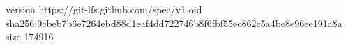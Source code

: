 version https://git-lfs.github.com/spec/v1
oid sha256:9cbeb7b6e7264ebd88d1eaf4dd722746b8f6fbf55ec862c5a4be8e96ee191a8a
size 174916
